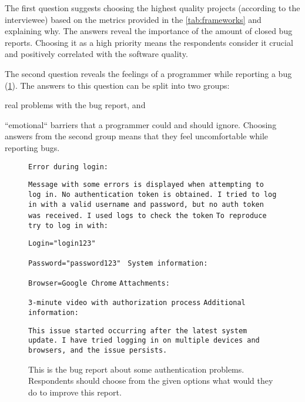 \documentclass[11pt,review,sigplan,nonacm,natbib=false]{acmart}
\begin{document}
The first question suggests choosing the highest quality projects (according to the interviewee) based on the metrics provided in the \cref{tab:frameworks} and explaining why. The answers reveal the importance of the amount of closed bug reports. Choosing it as a high priority means the respondents consider it crucial and positively correlated with the software quality.

The second question reveals the feelings of a programmer while reporting a bug (\cref{fig:fig1}). The answers to this question can be split into two groups: 
\begin{inparaenum}[1)]
    \item real problems with the bug report,
    and
    \item ``emotional`` barriers that a programmer could and should ignore. Choosing answers from the second group means that they feel uncomfortable while reporting bugs.
\end{inparaenum}

\begin{figure}
\begin{tcolorbox}[
    standard jigsaw,
    title=Bug report,
    opacityback=0,
    halign=left
]
\texttt{Error during login:} \par
\texttt{Message with some errors is displayed when attempting to log in. No authentication token is obtained. I tried to log in with a valid username and password, but no auth token was received. I used logs to check the token}
\newline
\newline
\texttt{To reproduce try to log in with:} \par
\texttt{Login="login123" }\par
\texttt{Password="password123" }
\newline
\newline
\texttt{System information: }\par
\texttt{Browser=Google Chrome} 
\newline
\newline
\texttt{Attachments: }\par
\texttt{3-minute video with authorization process}
\newline
\newline
\texttt{Additional information: }\par
\texttt{This issue started occurring after the latest system update. I have tried logging in on multiple devices and browsers, and the issue persists.}
\end{tcolorbox}
\caption{This is the bug report about some authentication problems. Respondents should choose from the given options what would they do to improve this report.}
\label{fig:fig1}
\end{figure}
\end{document}
